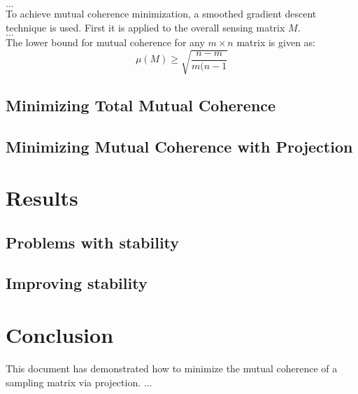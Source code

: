 \documentclass[journal]{IEEEtran}
\begin{document}
$\hdots$\\
To achieve mutual coherence minimization, a smoothed gradient descent technique is used.
First it is applied to the overall sensing matrix $M$. \\
$\hdots$\\
The lower bound for mutual coherence for any $m\times n$ matrix is given as:
\begin{equation}
\mu(M) \geq \sqrt{\frac{n - m}{m(n-1}}
\end{equation}
\subsection{Minimizing Total Mutual Coherence}

\subsection{Minimizing Mutual Coherence with Projection}


\section{Results}
\subsection{Problems with stability}

\subsection{Improving stability}

\section{Conclusion}
This document has demonstrated how to minimize the mutual coherence of a sampling
matrix via projection. $\ldots$
\end{document}
